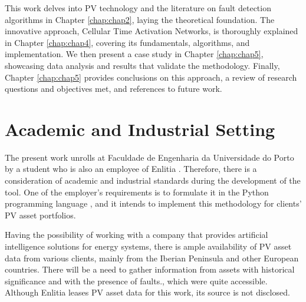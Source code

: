 This work delves into PV technology and the literature on fault detection algorithms in Chapter \ref{chap:chap2}, laying the theoretical foundation. The innovative approach, Cellular Time Activation Networks, is thoroughly explained in Chapter \ref{chap:chap4}, covering its fundamentals, algorithms, and implementation. We then present a case study in Chapter \ref{chap:chap5}, showcasing data analysis and results that validate the methodology. Finally, Chapter \ref{chap:chap5} provides conclusions on this approach, a review of research questions and objectives met, and references to future work.


\section{Academic and Industrial Setting}

The present work unrolls at Faculdade de Engenharia da Universidade do Porto by a student who is also an employee of Enlitia \cite{EL}. Therefore, there is a consideration of academic and industrial standards during the development of the tool. One of the employer's requirements is to formulate it in the Python programming language \cite{Python}, and it intends to implement this methodology for clients' PV asset portfolios. 

Having the possibility of working with a company that provides artificial intelligence solutions for energy systems, there is ample availability of PV asset data from various clients, mainly from the Iberian Peninsula and other European countries. There will be a need to gather information from assets with historical significance and with the presence of faults., which were quite accessible. Although Enlitia leases PV asset data for this work, its source is not disclosed.
